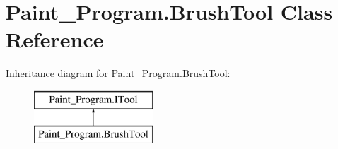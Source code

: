 \hypertarget{class_paint___program_1_1_brush_tool}{}\section{Paint\+\_\+\+Program.\+Brush\+Tool Class Reference}
\label{class_paint___program_1_1_brush_tool}
Inheritance diagram for Paint\+\_\+\+Program.\+Brush\+Tool\+:\begin{figure}[H]
\begin{center}
\leavevmode
\includegraphics[height=2.000000cm]{class_paint___program_1_1_brush_tool}
\end{center}
\end{figure}
